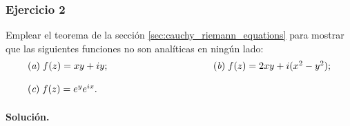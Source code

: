 \documentclass[a4paper]{report}
\begin{document}
\subsubsection{Ejercicio 2}

Emplear el teorema de la sección \ref{sec:cauchy_riemann_equations} para mostrar que las siguientes funciones no son analíticas en ningún lado:
\[
 \begin{array}{ll}
  (\textit{a})\;f(z)=xy+iy;\qquad\qquad\qquad\qquad\qquad&(\textit{b})\;f(z)=2xy+i(x^2-y^2);\\[\bigskipamount]
  (\textit{c})\;f(z)=e^{y}e^{ix}.
 \end{array}
\]

\paragraph{Solución.} 
\end{document}

